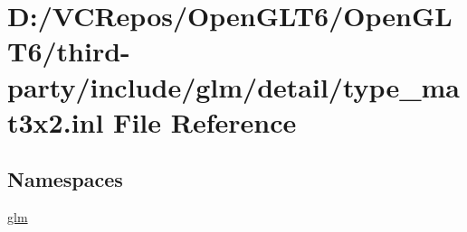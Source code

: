 \hypertarget{type__mat3x2_8inl}{}\section{D\+:/\+V\+C\+Repos/\+Open\+G\+L\+T6/\+Open\+G\+L\+T6/third-\/party/include/glm/detail/type\+\_\+mat3x2.inl File Reference}
\label{type__mat3x2_8inl}
\subsection*{Namespaces}
\begin{DoxyCompactItemize}
\item 
 \mbox{\hyperlink{namespaceglm}{glm}}
\end{DoxyCompactItemize}
